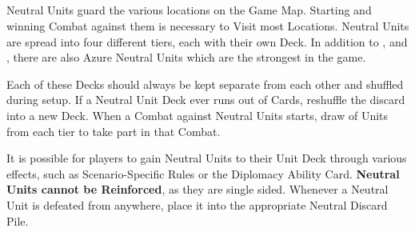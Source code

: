 \begin{multicols}{2}
\subsection*{}
Neutral Units guard the various locations on the Game Map.
Starting and winning Combat against them is necessary to Visit most Locations.
Neutral Units are spread into four different tiers, each with their own Deck.
In addition to ,  and , there are also Azure  Neutral Units which are the strongest in the game.\par
Each of these Decks should always be kept separate from each other and shuffled during setup.
If a Neutral Unit Deck ever runs out of Cards, reshuffle the discard into a new Deck.
When a Combat against Neutral Units starts, draw  of Units from each tier to take part in that Combat.\par
It is possible for players to gain Neutral Units to their Unit Deck through various effects, such as Scenario-Specific Rules or the Diplomacy Ability Card.
\textbf{Neutral Units cannot be Reinforced}, as they are single sided.
Whenever a Neutral Unit is defeated from anywhere, place it into the appropriate Neutral Discard Pile.\par


\end{multicols}

